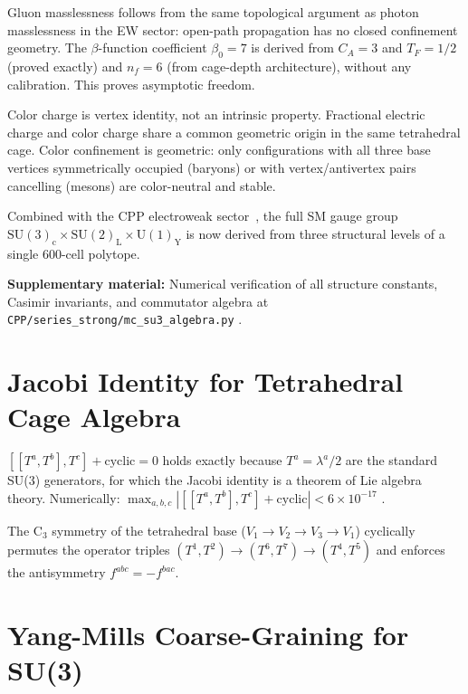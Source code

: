 \documentclass[11pt,a4paper]{article}
\begin{document}
Gluon masslessness follows from the same topological argument as
photon masslessness in the EW sector: open-path propagation has
no closed confinement geometry.  The $\beta$-function coefficient
$\beta_0 = 7$ is derived from $C_A = 3$ and $T_F = 1/2$ (proved
exactly) and $n_f = 6$ (from cage-depth architecture), without
any calibration.  This proves asymptotic freedom.

Color charge is vertex identity, not an intrinsic property.
Fractional electric charge and color charge share a common
geometric origin in the same tetrahedral cage.  Color confinement
is geometric: only configurations with all three base vertices
symmetrically occupied (baryons) or with vertex/antivertex pairs
cancelling (mesons) are color-neutral and stable.

Combined with the CPP electroweak sector~\citep{cpp_ew_unified},
the full SM gauge group
$\mathrm{SU(3)_c \times SU(2)_L \times U(1)_Y}$
is now derived from three structural levels of a single 600-cell
polytope.

\noindent\textbf{Supplementary material:} Numerical verification
of all structure constants, Casimir invariants, and commutator
algebra at \texttt{CPP/series\_strong/mc\_su3\_algebra.py}
\citep{cpp_ss_mc}.

\appendix

\section{Jacobi Identity for Tetrahedral Cage Algebra}
\label{app:jacobi}

$[[T^a,T^b],T^c]+\text{cyclic}=0$ holds exactly because $T^a =
\lambda^a/2$ are the standard SU(3) generators, for which the Jacobi
identity is a theorem of Lie algebra theory.  Numerically:
$\max_{a,b,c}|[[T^a,T^b],T^c]+\text{cyclic}| < 6\times10^{-17}$
\citep{cpp_ss_mc}.

The C$_3$ symmetry of the tetrahedral base ($V_1\to V_2\to V_3\to
V_1$) cyclically permutes the operator triples
$(T^1,T^2)\to(T^6,T^7)\to(T^4,T^5)$ and enforces the
antisymmetry $f^{abc} = -f^{bac}$.

\section{Yang-Mills Coarse-Graining for SU(3)}
\label{app:coarse}
\end{document}
